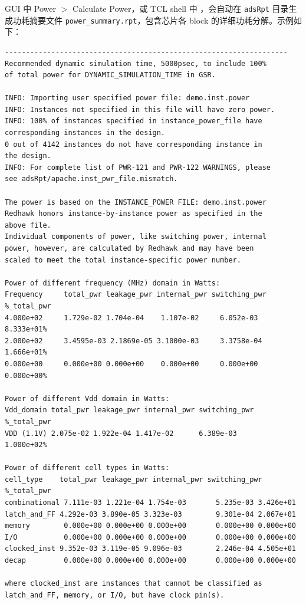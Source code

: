 GUI 中 Power $>$ Calculate Power，或 TCL shell 中 ，会自动在 \texttt{adsRpt} 目录生成功耗摘要文件 \texttt{power\_summary.rpt}，包含芯片各 block 的详细功耗分解。示例如下：
\begin{lstlisting}
-------------------------------------------------------------------
Recommended dynamic simulation time, 5000psec, to include 100%
of total power for DYNAMIC_SIMULATION_TIME in GSR.

INFO: Importing user specified power file: demo.inst.power
INFO: Instances not specified in this file will have zero power.
INFO: 100% of instances specified in instance_power_file have
corresponding instances in the design.
0 out of 4142 instances do not have corresponding instance in
the design.
INFO: For complete list of PWR-121 and PWR-122 WARNINGS, please
see adsRpt/apache.inst_pwr_file.mismatch.

The power is based on the INSTANCE_POWER FILE: demo.inst.power
Redhawk honors instance-by-instance power as specified in the
above file.
Individual components of power, like switching power, internal
power, however, are calculated by Redhawk and may have been
scaled to meet the total instance-specific power number.

Power of different frequency (MHz) domain in Watts:
Frequency     total_pwr leakage_pwr internal_pwr switching_pwr %_total_pwr
4.000e+02     1.729e-02 1.704e-04    1.107e-02     6.052e-03    8.333e+01%
2.000e+02     3.4595e-03 2.1869e-05 3.1000e-03     3.3758e-04   1.666e+01%
0.000e+00     0.000e+00 0.000e+00    0.000e+00     0.000e+00    0.000e+00%

Power of different Vdd domain in Watts:
Vdd_domain total_pwr leakage_pwr internal_pwr switching_pwr %_total_pwr
VDD (1.1V) 2.075e-02 1.922e-04 1.417e-02      6.389e-03      1.000e+02%

Power of different cell types in Watts:
cell_type    total_pwr leakage_pwr internal_pwr switching_pwr %_total_pwr
combinational 7.111e-03 1.221e-04 1.754e-03       5.235e-03 3.426e+01
latch_and_FF 4.292e-03 3.890e-05 3.323e-03        9.301e-04 2.067e+01
memory        0.000e+00 0.000e+00 0.000e+00       0.000e+00 0.000e+00
I/O           0.000e+00 0.000e+00 0.000e+00       0.000e+00 0.000e+00
clocked_inst 9.352e-03 3.119e-05 9.096e-03        2.246e-04 4.505e+01
decap         0.000e+00 0.000e+00 0.000e+00       0.000e+00 0.000e+00

where clocked_inst are instances that cannot be classified as
latch_and_FF, memory, or I/O, but have clock pin(s).


\end{lstlisting}
